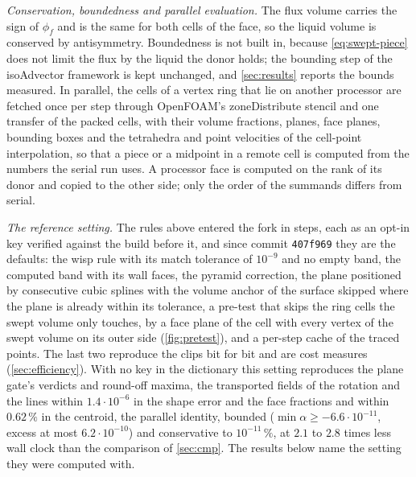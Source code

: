 \documentclass[preprint,12pt]{elsarticle}
\begin{document}
\emph{Conservation, boundedness and parallel evaluation.} The flux volume carries the sign of $\phi_f$ and is the same for both cells of the face, so the liquid volume is conserved by antisymmetry. Boundedness is not built in, because \cref{eq:swept-piece} does not limit the flux by the liquid the donor holds; the bounding step of the isoAdvector framework is kept unchanged, and \cref{sec:results} reports the bounds measured. In parallel, the cells of a vertex ring that lie on another processor are fetched once per step through OpenFOAM's zoneDistribute stencil \citep{ScheuflerRoenby2019} and one transfer of the packed cells, with their volume fractions, planes, face planes, bounding boxes and the tetrahedra and point velocities of the cell-point interpolation, so that a piece or a midpoint in a remote cell is computed from the numbers the serial run uses. A processor face is computed on the rank of its donor and copied to the other side; only the order of the summands differs from serial.



\emph{The reference setting.} The rules above entered the fork in steps, each as an opt-in key verified against the build before it, and since commit \texttt{407f969} they are the defaults: the wisp rule with its match tolerance of $10^{-9}$ and no empty band, the computed band with its wall faces, the pyramid correction, the plane positioned by consecutive cubic splines with the volume anchor of the surface skipped where the plane is already within its tolerance, a pre-test that skips the ring cells the swept volume only touches, by a face plane of the cell with every vertex of the swept volume on its outer side (\cref{fig:pretest}), and a per-step cache of the traced points. The last two reproduce the clips bit for bit and are cost measures (\cref{sec:efficiency}). With no key in the dictionary this setting reproduces the plane gate's verdicts and round-off maxima, the transported fields of the rotation and the lines within $1.4\cdot10^{-6}$ in the shape error and the face fractions and within $0.62\,\%$ in the centroid, the parallel identity, bounded ($\min\alpha \ge -6.6\cdot10^{-11}$, excess at most $6.2\cdot10^{-10}$) and conservative to $10^{-11}\,\%$, at $2.1$ to $2.8$ times less wall clock than the comparison of \cref{sec:cmp}. The results below name the setting they were computed with.
\end{document}
